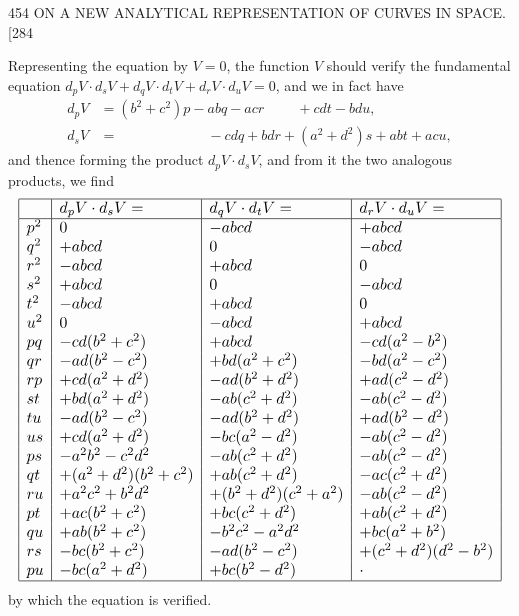 \documentclass[11pt]{article}
\begin{document}
\begin{center}
454 \hfill ON A NEW ANALYTICAL REPRESENTATION OF CURVES IN SPACE. \hfill \textsc{[284}
\end{center}

Representing the equation by $V=0$, the function $V$ should verify the fundamental
equation $d_{p}V\cdot d_{s}V+d_{q}V\cdot d_{t}V+d_{r}V\cdot d_{u}V=0$, and we in fact have
\begin{align*}
d_{p}V &= (b^{2}+c^{2})p-abq-acr\phantom{-bdu}+cdt-bdu, \\
d_{s}V &= \phantom{(b^{2}+c^{2})p-}-cdq+bdr+(a^{2}+d^{2})s+abt+acu,
\end{align*}
and thence forming the product $d_{p}V\cdot d_{s}V$, and from it the two analogous products, we
find
\[ \resizebox{\textwidth}{!}{$\displaystyle
\begin{array}{|l|l|l|l|}
\hline
 & d_{p}V\cdot d_{s}V= & d_{q}V\cdot d_{t}V= & d_{r}V\cdot d_{u}V= \\
\hline
p^{2} & 0 & -abcd & +abcd \\
q^{2} & +abcd & 0 & -abcd \\
r^{2} & -abcd & +abcd & 0 \\
s^{2} & +abcd & 0 & -abcd \\
t^{2} & -abcd & +abcd & 0 \\
u^{2} & 0 & -abcd & +abcd \\
pq & -cd(b^{2}+c^{2}) & +abcd & -cd(a^{2}-b^{2}) \\
qr & -ad(b^{2}-c^{2}) & +bd(a^{2}+c^{2}) & -bd(a^{2}-c^{2}) \\
rp & +cd(a^{2}+d^{2}) & -ad(b^{2}+d^{2}) & +ad(c^{2}-d^{2}) \\
st & +bd(a^{2}+d^{2}) & -ab(c^{2}+d^{2}) & -ab(c^{2}-d^{2}) \\
tu & -ad(b^{2}-c^{2}) & -ad(b^{2}+d^{2}) & +ad(b^{2}-d^{2}) \\
us & +cd(a^{2}+d^{2}) & -bc(a^{2}-d^{2}) & -ab(c^{2}-d^{2}) \\
ps & -a^{2}b^{2}-c^{2}d^{2} & -ab(c^{2}+d^{2}) & -ab(c^{2}-d^{2}) \\
qt & +(a^{2}+d^{2})(b^{2}+c^{2}) & +ab(c^{2}+d^{2}) & -ac(c^{2}+d^{2}) \\
ru & +a^{2}c^{2}+b^{2}d^{2} & +(b^{2}+d^{2})(c^{2}+a^{2}) & -ab(c^{2}-d^{2}) \\
pt & +ac(b^{2}+c^{2}) & +bc(c^{2}+d^{2}) & +ab(c^{2}+d^{2}) \\
qu & +ab(b^{2}+c^{2}) & -b^{2}c^{2}-a^{2}d^{2} & +bc(a^{2}+b^{2}) \\
rs & -bc(b^{2}+c^{2}) & -ad(b^{2}-c^{2}) & +(c^{2}+d^{2})(d^{2}-b^{2}) \\
pu & -bc(a^{2}+d^{2}) & +bc(b^{2}-d^{2}) & \cdot \\
\hline
\end{array}
$} \]
by which the equation is verified.
\end{document}
